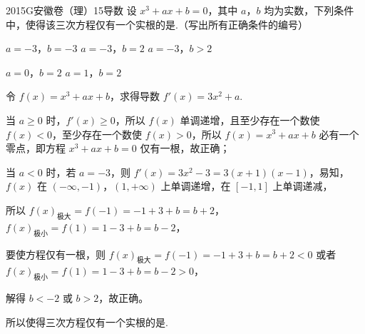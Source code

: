 
\begin{problem}{2015}{G}{安徽卷（理）}{15}{导数}
设 $ x^3 + ax + b = 0 $，其中 $ a $，$ b $ 均为实数，下列条件中，使得该三次方程仅有一个实根的是\underline{\hspace{4em}}.（写出所有正确条件的编号）

 $ a = -3 $，$ b = -3 $\qquad {} $ a = -3 $，$ b = 2 $\qquad {} $ a = -3 $，$ b > 2 $

 $ a = 0 $，$ b = 2 $\qquad {} $ a = 1 $，$ b = 2 $
\end{problem}

\begin{answer}
\end{answer}

\begin{solutions}
令 $ f(x) = x^3 + ax + b $，求得导数 $ f'(x) = 3x^2 + a $.

当 $ a \geq 0 $ 时，$ f'(x) \geq 0 $，所以 $ f(x) $ 单调递增，且至少存在一个数使 $ f(x) < 0 $，至少存在一个数使 $ f(x) > 0 $，所以 $ f(x) = x^3 + ax + b $ 必有一个零点，即方程 $ x^3 + ax + b = 0 $ 仅有一根，故正确；

当 $ a < 0 $ 时，若 $ a = -3 $，则 $ f'(x) = 3x^2 - 3 = 3(x+1)(x-1) $，易知，$ f(x) $ 在 $ (-\infty, -1) $，$ (1, +\infty) $ 上单调递增，在 $ [-1, 1] $ 上单调递减，

所以 $ f(x)_{\text{极大}} = f(-1) = -1 + 3 + b = b + 2 $，$ f(x)_{\text{极小}} = f(1) = 1 - 3 + b = b - 2 $，

要使方程仅有一根，则 $ f(x)_{\text{极大}} = f(-1) = -1 + 3 + b = b + 2 < 0 $ 或者 $ f(x)_{\text{极小}} = f(1) = 1 - 3 + b = b - 2 > 0 $，

解得 $ b < -2 $ 或 $ b > 2 $，故正确。

所以使得三次方程仅有一个实根的是.
\end{solutions}